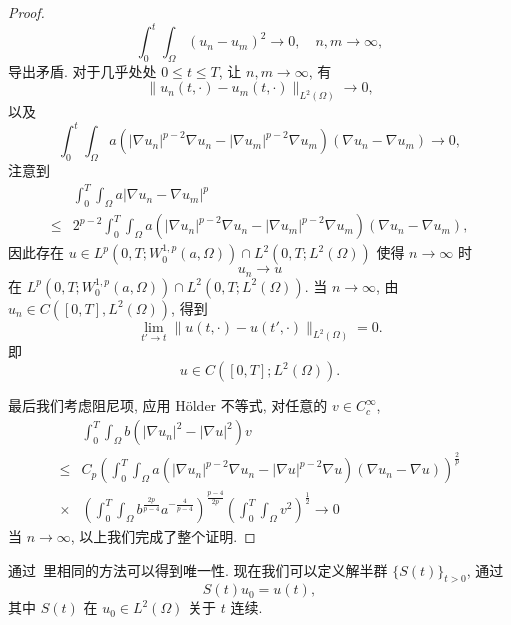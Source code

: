 \documentclass[twoside,longtitle]{LZUthesis}
\theoremstyle{definition}
\numberwithin{equation}{chapter}
\newcommand*\abs[1]{\lvert#1\rvert}
\newcommand*\norm[1]{\lVert#1\rVert}
\newcommand*\Brace[1]{\lbrace#1\rbrace}
\begin{document}
\begin{proof}
\begin{equation}
		\int_0^t\int_{\Omega}\left(u_n-u_m\right)^2 \to 0, \quad n, m \to \infty,
	\end{equation}
	导出矛盾. 对于几乎处处 $0 \leq t \leq T$, 让 $n,m \to \infty$, 有
	\begin{equation}\label{cauchy_in_L2}
		\norm{u_n(t,\cdot)-u_m(t,\cdot)}_{L^2(\Omega)} \to 0,
	\end{equation}
	以及
	\begin{equation}\label{cauchy_in_W1pa}
		\int_{0}^{t}\int_{\Omega}a
		\left(\abs{\nabla u_n}^{p-2}\nabla u_n
		- \abs{\nabla u_m}^{p-2}\nabla u_m\right)
		\left(\nabla u_n - \nabla u_m\right)
		\to 0,
	\end{equation}
	注意到
	\begin{equation}
		\begin{split}
			& \int_0^T\int_{\Omega}a\abs{\nabla u_n - \nabla u_m}^p\\
			\leq{} & 2^{p-2}\int_{0}^{T}\int_{\Omega}a
			\left(\abs{\nabla u_n}^{p-2}\nabla u_n
			- \abs{\nabla u_m}^{p-2}\nabla u_m\right)
			\left(\nabla u_n - \nabla u_m\right),
		\end{split}
	\end{equation}
	因此存在 $u \in L^p(0, T; W_0^{1,p}(a,\Omega))
		\cap L^2(0, T; L^2(\Omega))$ 使得 $n \to \infty$ 时
	\begin{equation}
		u_{n} \to u
	\end{equation}
	在 $L^p(0, T; W_0^{1,p}(a,\Omega))\cap L^2(0, T; L^2(\Omega))$.
	当 $n \to \infty$, 由 $u_n \in C([0, T], L^2(\Omega))$, 得到
	\begin{equation}
		\lim_{t' \to t}\norm{u(t,\cdot)-u(t',\cdot)}_{L^2(\Omega)}=0.
	\end{equation}
	即
	\begin{equation*}
		u \in C([0, T]; L^2(\Omega)).
	\end{equation*}

	最后我们考虑阻尼项, 应用 H\"older 不等式,
	对任意的 $v \in C_c^\infty$,
	\begin{equation}
		\begin{split}
			& \int_0^T\int_{\Omega}b\left(\abs{\nabla u_n}^2
			- \abs{\nabla u}^2\right)v\\
			\leq{} & C_p\left(\int_0^T\int_{\Omega}a
			\left(\abs{\nabla u_n}^{p-2}\nabla u_n
			- \abs{\nabla u}^{p-2}\nabla u\right)
			\left(\nabla u_n - \nabla u\right)\right)^{\frac{2}{p}}\\
			\times{} & \left(\int_0^T\int_{\Omega}b^{\frac{2p}{p-4}}a^{-\frac{4}{p-4}}\right)^{\frac{p-4}{2p}}
			\left(\int_0^T\int_{\Omega}v^2\right)^{\frac{1}{2}} \to 0
		\end{split}
	\end{equation}
	当 $n \to \infty$, 以上我们完成了整个证明.
\end{proof}
通过~\cite{Zhan2019Uniquenessa}里相同的方法可以得到唯一性.
现在我们可以定义解半群 $\Brace{S(t)}_{t>0}$,
通过
\begin{equation}
	S(t)u_0 = u(t),
\end{equation}
其中 $S(t)$ 在 $u_{0} \in L^2(\Omega)$ 关于 $t$ 连续.
\end{document}
